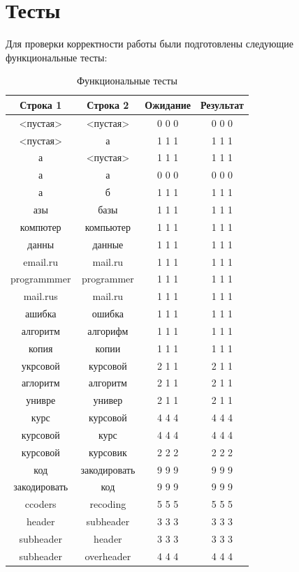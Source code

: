 \documentclass[14pt, a4paper]{report}
\begin{document}
	\section{Тесты}
	Для проверки корректности работы были подготовлены следующие функциональные тесты:\\
	\begin{table}[ht!]
		\begin{tabular}{|c|c|c|c|}
		\hline
		\bf{Строка 1} & \bf{Строка 2} & \bf{Ожидание} & \bf{Результат}\\\hline
		<пустая> & <пустая> & 0 0 0 & 0 0 0\\\hline
		<пустая> & а & 1 1 1 & 1 1 1\\\hline
		а & <пустая> & 1 1 1 & 1 1 1\\\hline
		а & а & 0 0 0 & 0 0 0\\\hline
		а & б & 1 1 1 & 1 1 1\\\hline
		азы & базы & 1 1 1 & 1 1 1\\\hline
		компютер & компьютер & 1 1 1 & 1 1 1\\\hline
		данны & данные & 1 1 1 & 1 1 1\\\hline
		email.ru & mail.ru & 1 1 1 & 1 1 1\\\hline
		programmmer & programmer & 1 1 1 & 1 1 1\\\hline
		mail.rus & mail.ru & 1 1 1 & 1 1 1\\\hline
		ашибка & ошибка & 1 1 1 & 1 1 1\\\hline
		алгоритм & алгорифм & 1 1 1 & 1 1 1\\\hline
		копия & копии & 1 1 1 & 1 1 1\\\hline
		укрсовой & курсовой & 2 1 1 & 2 1 1\\\hline
		аглоритм & алгоритм & 2 1 1 & 2 1 1\\\hline
		унивре & универ & 2 1 1 & 2 1 1\\\hline
		курс & курсовой & 4 4 4 & 4 4 4\\\hline
		курсовой & курс & 4 4 4 & 4 4 4\\\hline
		курсовой & курсовик & 2 2 2 & 2 2 2\\\hline
		код & закодировать & 9 9 9 & 9 9 9\\\hline
		закодировать & код & 9 9 9 & 9 9 9\\\hline
		ccoders & recoding & 5 5 5 & 5 5 5\\\hline
		header & subheader & 3 3 3 & 3 3 3\\\hline
		subheader & header & 3 3 3 & 3 3 3\\\hline
		subheader & overheader & 4 4 4 & 4 4 4\\\hline
		\end{tabular}
		\caption{Функциональные тесты}
	\end{table}
\end{document}
